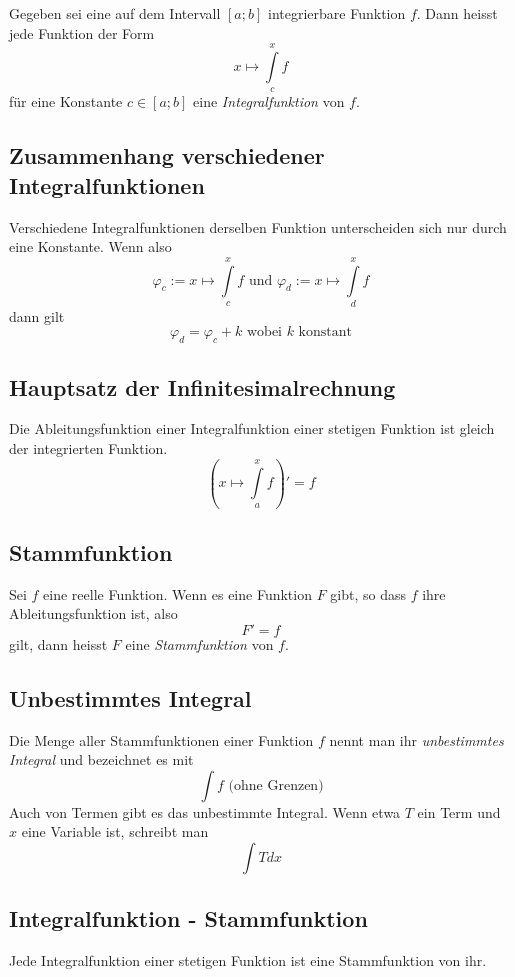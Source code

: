Gegeben sei eine auf dem Intervall $[a;b]$ integrierbare Funktion $f$. Dann
heisst jede Funktion der Form
$$x \mapsto \int\limits_c^x f$$
für eine Konstante $c \in [a;b]$ eine \emph{Integralfunktion} von $f$.


\subsection{Zusammenhang verschiedener Integralfunktionen}

Verschiedene Integralfunktionen derselben Funktion unterscheiden sich nur durch
eine Konstante. Wenn also
$$\varphi_c := x \mapsto \int\limits_c^x f \textrm{ und } \varphi_d := x
    \mapsto \int\limits_d^x f$$
dann gilt
$$\varphi_d = \varphi_c + k \textrm{ wobei } k \textrm{ konstant}$$


\subsection{Hauptsatz der Infinitesimalrechnung}

Die Ableitungsfunktion einer Integralfunktion einer stetigen Funktion ist gleich
der integrierten Funktion.
$$\left(x \mapsto \int\limits_a^x f\right)' = f$$


\subsection{Stammfunktion}

Sei $f$ eine reelle Funktion. Wenn es eine Funktion $F$ gibt, so dass $f$ ihre
Ableitungsfunktion ist, also
$$F' = f$$
gilt, dann heisst $F$ eine \emph{Stammfunktion} von $f$.


\subsection{Unbestimmtes Integral}

Die Menge aller Stammfunktionen einer Funktion $f$ nennt man ihr
\emph{unbestimmtes Integral} und bezeichnet es mit
$$\int f \textrm{ (ohne Grenzen)}$$
Auch von Termen gibt es das unbestimmte Integral. Wenn etwa $T$ ein Term und
$x$ eine Variable ist, schreibt man
$$\int Tdx$$


\subsection{Integralfunktion - Stammfunktion}

Jede Integralfunktion einer stetigen Funktion ist eine Stammfunktion von ihr.


